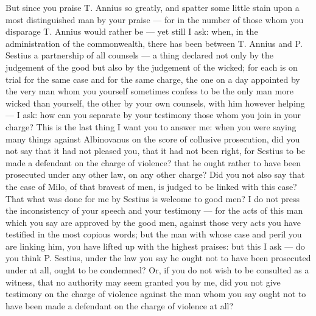  But since you praise T. Annius so greatly, and spatter some little stain upon a most distinguished man by your praise --- for in the number of those whom you disparage T. Annius would rather be --- yet still I ask: when, in the administration of the commonwealth, there has been between T. Annius and P. Sestius a partnership of all counsels --- a thing declared not only by the judgement of the good but also by the judgement of the wicked; for each is on trial for the same case and for the same charge, the one on a day appointed by the very man whom you yourself sometimes confess to be the only man more wicked than yourself, the other by your own counsels, with him however helping --- I ask: how can you separate by your testimony those whom you join in your charge? This is the last thing I want you to answer me: when you were saying many things against Albinovanus on the score of collusive prosecution, did you not say that it had not pleased you, that it had not been right, for Sestius to be made a defendant on the charge of violence? that he ought rather to have been prosecuted under any other law, on any other charge? Did you not also say that the case of Milo, of that bravest of men, is judged to be linked with this case? That what was done for me by Sestius is welcome to good men? I do not press the inconsistency of your speech and your testimony --- for the acts of this man which you say are approved by the good men, against those very acts you have testified in the most copious words; but the man with whose case and peril you are linking him, you have lifted up with the highest praises: but this I ask --- do you think P. Sestius, under the law you say he ought not to have been prosecuted under at all, ought to be condemned? Or, if you do not wish to be consulted as a witness, that no authority may seem granted you by me, did you not give testimony on the charge of violence against the man whom you say ought not to have been made a defendant on the charge of violence at all?
